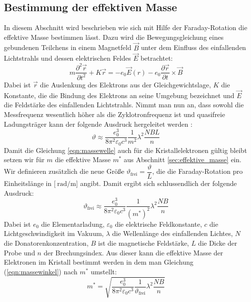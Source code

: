 \subsection{Bestimmung der effektiven Masse}
\label{sec:effektivemasse}
In diesem Abschnitt wird beschrieben wie sich mit Hilfe der Faraday-Rotation die effektive Masse bestimmen lässt. Dazu wird die Bewegungsgleichung eines gebundenen Teilchens in einem Magnetfeld $\vec{B}$ unter dem Einfluss des einfallenden Lichtstrahls und dessen elektrischen Feldes $\vec{E}$ betrachtet:
\begin{equation}
  \label{eqn:bewegung}
  m\dfrac{\partial^2\vec{r}}{\partial t^2}+K\vec{r}=-e_\mathrm{0}\vec{E}(r)-e_\mathrm{0}\dfrac{\partial \vec{r}}{\partial t}\times \vec{B}
\end{equation}
Dabei ist $\vec{r}$ die Auslenkung des Elektrons aus der Gleichgewichtslage, $K$ die Konstante, die die Bindung des Elektrons an seine Umgebung bezeichnet und $\vec{E}$ die Feldstärke des einfallenden Lichtstrahls. Nimmt man nun an, dass sowohl die Messfrequenz wesentlich höher als die Zyklotronfrequenz ist und quasifreie Ladungsträger kann der folgende Ausdruck hergeleitet werden \cite[5-8]{Anleitung}:
\begin{equation}
  \label{eqn:massewelle}
  \vartheta\approx\dfrac{e_\mathrm{0}^3}{8\pi^2\varepsilon_\mathrm{0}c^3}\dfrac{1}{m^2}\lambda^2\dfrac{NBL}{n}
\end{equation}
Damit die Gleichung \ref{eqn:massewelle} auch für die Kristallelektronen gültig bleibt setzen wir für $m$ die effektive Masse $m^*$ aus Abschnitt \ref{sec:effektive_masse} ein. Wir definieren zusätzlich die neue Größe $\vartheta_\mathrm{frei}=\dfrac{\vartheta}{L}$, die die Faraday-Rotation pro Einheitslänge in [$\SI{}{\radian\per\meter}$] angibt. Damit ergibt sich schlussendlich der folgende Ausdruck:
\begin{equation}
  \label{eqn:massewinkel}
  \vartheta_\mathrm{frei}\approx\dfrac{e_\mathrm{0}^3}{8\pi^2\varepsilon_\mathrm{0}c^3}\dfrac{1}{(m^*)^2}\lambda^2\dfrac{NB}{n}
\end{equation}
Dabei ist $e_\mathrm{0}$ die Elementarladung, $\varepsilon_\mathrm{0}$ die elektrische Feldkonstante, $c$ die Lichtgeschwindigkeit im Vakuum, $\lambda$ die Wellenlänge des einfallenden Lichtes, $N$ die Donatorenkonzentration, $B$ ist die magnetische Feldstärke, $L$ die Dicke der Probe und $n$ der Brechungsindex.
Aus dieser kann die effektive Masse der Elektronen im Kristall bestimmt werden in dem man Gleichung (\ref{eqn:massewinkel}) nach $m^*$ umstellt:
\begin{equation}
  \label{eqn:massefinal}
  m^*=\sqrt{\dfrac{e_\mathrm{0}^3}{8\pi^2\varepsilon_\mathrm{0}c^3}\dfrac{1}{\vartheta_\mathrm{frei}}\lambda^2\dfrac{NB}{n}}
\end{equation}
